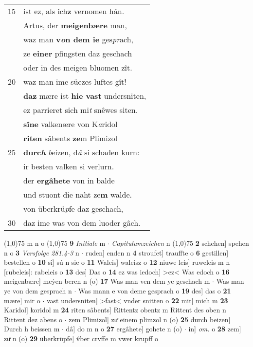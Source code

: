 \documentclass[8pt,a4paper,notitlepage]{article}
\begin{document}
\begin{table}[ht]
\begin{minipage}[t]{0.5\linewidth}
\begin{tabular}{rl}
15 & ist ez, als ich\textbf{z} vernomen hân.\\ 
 & Artus, der \textbf{meigenbære} man,\\ 
 & waz man \textbf{v\textit{o}n dem ie} ges\textit{pr}ach,\\ 
 & ze \textbf{einer} pfingsten daz geschach\\ 
 & oder in des meigen bluomen zît.\\ 
20 & waz man ime süezes luftes gît!\\ 
 & \textbf{daz} mære ist \textbf{hie vast} undersniten,\\ 
 & ez parrieret sich mi\textit{t} snêwes siten.\\ 
 & \textbf{sîne} valkenære von K\textit{a}ridol\\ 
 & \textbf{riten} sâbents \textbf{ze}m Plimizol\\ 
25 & \textbf{durc\textit{h}} \textit{b}eizen, d\textit{â} si schaden kurn:\\ 
 & ir besten valken si verlurn.\\ 
 & der \textbf{ergâhete} von in balde\\ 
 & und stuont die naht ze\textbf{m} walde.\\ 
 & von überkrü\textit{p}fe daz geschach,\\ 
30 & daz ime was von dem luoder gâch.\\ 
\end{tabular}
\scriptsize
\line(1,0){75} \newline
m n o \newline
\line(1,0){75} \newline
\textbf{9} \textit{Initiale} m   $\cdot$ \textit{Capitulumzeichen} n  \newline
\line(1,0){75} \newline
\textbf{2} schehen] spehen n o \textbf{3} \textit{Versfolge 281.4-3} n   $\cdot$ ruden] enden n \textbf{4} stroufet] trauffte o \textbf{6} gestillen] bestellen o \textbf{10} sî] sú n sie o \textbf{11} Waleis] waleisz o \textbf{12} niuwe leis] ruweleis m n [rubeleis]: rabeleis o \textbf{13} des] Das o \textbf{14} ez was iedoch] >ez< Was edoch o \textbf{16} meigenbære] meẏen beren n (o) \textbf{17} Was man ven dem ye geschach m  $\cdot$ Was man ye von dem gesprach n  $\cdot$ Was mann e von deme gesprach o \textbf{19} des] das o \textbf{21} mære] mir o  $\cdot$ vast undersniten] >fast< vnder snitten o \textbf{22} mit] mich m \textbf{23} Karidol] koridol m \textbf{24} riten sâbents] Rittentz obentz m Rittent des oben n Rittent dez abens o  $\cdot$ zem Plimizol] zuͯ einem plimzol n (o) \textbf{25} durch beizen] Durch h beissen m  $\cdot$ dâ] do m n o \textbf{27} ergâhete] gohete n (o)  $\cdot$ in] \textit{om.} o \textbf{28} zem] zuͯ n (o) \textbf{29} überkrüpfe] v̂ber crvffe m vwer krupff o \newline
\end{minipage}
\end{table}
\end{document}
